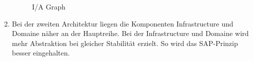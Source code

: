 \documentclass[]{article}
\begin{document}
\begin{enumerate}
\begin{figure}
	\caption{I/A Graph}
\end{figure}
\item 
Bei der zweiten Architektur liegen die Komponenten Infrastructure und Domaine näher an der Hauptreihe. Bei der Infrastructure und Domaine wird mehr Abstraktion bei gleicher Stabilität erzielt. So wird das SAP-Prinzip besser eingehalten.  


\end{enumerate}
	
\end{document}
